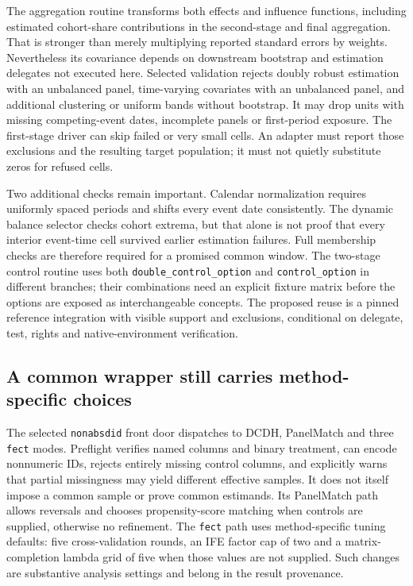 The aggregation routine transforms both effects and influence functions, including estimated cohort-share contributions
in the second-stage and final aggregation. That is stronger than merely multiplying reported standard errors by weights.
Nevertheless its covariance depends on downstream bootstrap and estimation delegates not executed here. Selected validation
rejects doubly robust estimation with an unbalanced panel, time-varying covariates with an unbalanced panel, and additional
clustering or uniform bands without bootstrap. It may drop units with missing competing-event dates, incomplete panels or
first-period exposure. The first-stage driver can skip failed or very small cells. An adapter must report those exclusions
and the resulting target population; it must not quietly substitute zeros for refused cells.\citep{exec28_panel_delegates}

Two additional checks remain important. Calendar normalization requires uniformly spaced periods and shifts every event
date consistently. The dynamic balance selector checks cohort extrema, but that alone is not proof that every interior
event-time cell survived earlier estimation failures. Full membership checks are therefore required for a promised common
window. The two-stage control routine uses both \texttt{double\_control\_option} and \texttt{control\_option} in different
branches; their combinations need an explicit fixture matrix before the options are exposed as interchangeable concepts.
The proposed reuse is a pinned reference integration with visible support and exclusions, conditional on delegate, test,
rights and native-environment verification.\citep{exec28_panel_delegates}

\subsection{A common wrapper still carries method-specific choices}

The selected \texttt{nonabsdid} front door dispatches to DCDH, PanelMatch and three \texttt{fect} modes. Preflight verifies
named columns and binary treatment, can encode nonnumeric IDs, rejects entirely missing control columns, and explicitly
warns that partial missingness may yield different effective samples. It does not itself impose a common sample or prove
common estimands. Its PanelMatch path allows reversals and chooses propensity-score matching when controls are supplied,
otherwise no refinement. The \texttt{fect} path uses method-specific tuning defaults: five cross-validation rounds,
an IFE factor cap of two and a matrix-completion lambda grid of five when those values are not supplied. Such changes are
substantive analysis settings and belong in the result provenance.\citep{exec28_panel_delegates}


